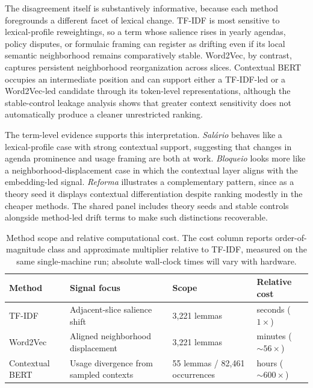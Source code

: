 \documentclass[12pt]{article}
\begin{document}
The disagreement itself is substantively informative, because each method
foregrounds a different facet of lexical change. TF-IDF is most sensitive to
lexical-profile reweightings, so a term whose salience rises in yearly agendas,
policy disputes, or formulaic framing can register as drifting even if its local
semantic neighborhood remains comparatively stable. Word2Vec, by contrast,
captures persistent neighborhood reorganization across slices. Contextual BERT
occupies an intermediate position and can support either a TF-IDF-led or a
Word2Vec-led candidate through its token-level representations, although the
stable-control leakage analysis shows that greater context sensitivity does not
automatically produce a cleaner unrestricted ranking.

The term-level evidence supports this interpretation. \textit{Sal\'ario}
behaves like a lexical-profile case with strong contextual support, suggesting
that changes in agenda prominence and usage framing are both at work.
\textit{Bloqueio} looks more like a neighborhood-displacement case in which the
contextual layer aligns with the embedding-led signal. \textit{Reforma}
illustrates a complementary pattern, since as a theory seed it displays
contextual differentiation despite ranking modestly in the cheaper methods. The
shared panel includes theory seeds and stable controls alongside method-led
drift terms to make such distinctions recoverable.

\begin{table}[!htb]
    \centering
    \footnotesize
    \caption{Method scope and relative computational cost. The cost column
    reports order-of-magnitude class
    and approximate multiplier relative to TF-IDF, measured on the same
    single-machine run; absolute wall-clock times will vary with hardware.}
    \label{tab:method_profile}
    \begin{tabularx}{\linewidth}{@{}l>{\raggedright\arraybackslash}Xl >{\raggedright\arraybackslash}X@{}}
        \toprule
        Method & Signal focus & Scope & Relative cost \\
        \midrule
        TF-IDF & Adjacent-slice salience shift & 3{,}221 lemmas & seconds ($1{\times}$) \\
        Word2Vec & Aligned neighborhood displacement & 3{,}221 lemmas & minutes (${\sim}56{\times}$) \\
        Contextual BERT & Usage divergence from sampled contexts & 55 lemmas / 82{,}461 occurrences & hours (${\sim}600{\times}$) \\
        \bottomrule
    \end{tabularx}
\end{table}
\end{document}
